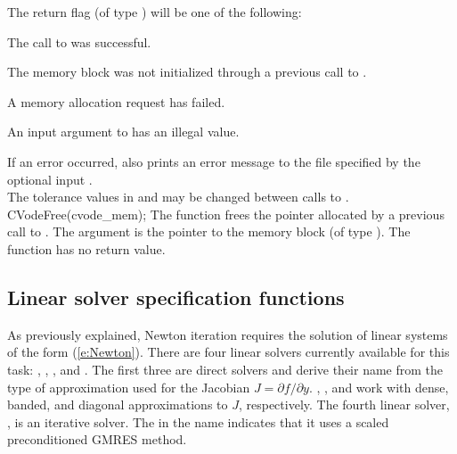 {
  The return flag  (of type ) will be one of the following:
  \begin{args}
  \item[\Id{CV\_SUCCESS}]
    The call to  was successful.
  \item[\Id{CV\_MEM\_NULL}] 
    The {\cvode} memory block was not initialized through a previous call
    to .
  \item[\Id{CV\_MEM\_FAIL}] 
    A memory allocation request has failed.
  \item[\Id{CV\_ILL\_INPUT}] 
    An input argument to  has an illegal value.
  \end{args}
}
{
  If an error occurred,  also prints an error message to the
  file specified by the optional input . \\
  The tolerance values in  and  may be changed between
  calls to .
}
{
  CVodeFree(cvode\_mem);
}
{
  The function  frees the pointer allocated by
  a previous call to .
}
{
  The argument is the pointer to the {\cvode} memory block (of type ).
}
{
  The function  has no return value.
}
{}
\subsection{Linear solver specification functions}\label{sss:lin_solv_init}

As previously explained, Newton iteration requires the solution of
linear systems of the form (\ref{e:Newton}).  There are four {\cvode} linear
solvers currently available for this task: {\cvdense}, {\cvband}, {\cvdiag},
and {\cvspgmr}.  The first three are direct solvers and derive their name
from the type of approximation used for the Jacobian 
$J = \partial{f}/\partial{y}$.  {\cvdense}, {\cvband}, and {\cvdiag} work with
dense, banded, and diagonal approximations to $J$, respectively.  The
fourth {\cvode} linear solver, {\cvspgmr}, is an iterative solver.  The {\spgmr}
in the name indicates that it uses a scaled preconditioned
GMRES method.

